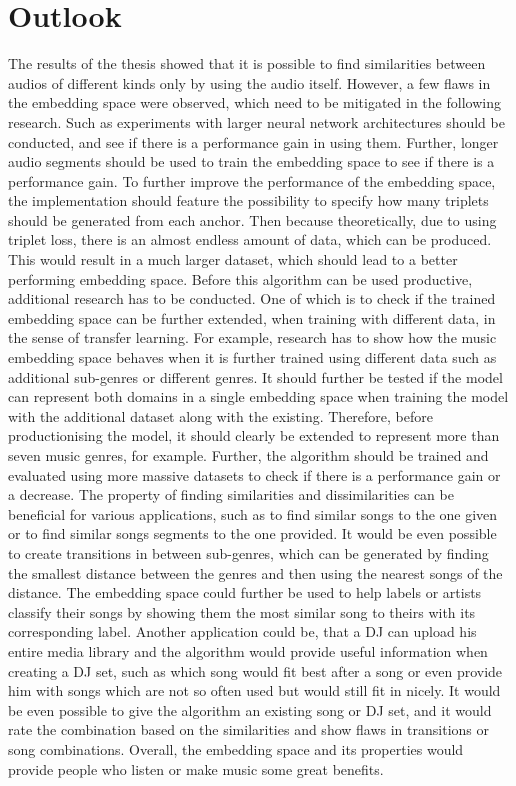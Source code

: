 \section{Outlook}
\label{sec:Outlook}
The results of the thesis showed that it is possible to find similarities between audios of different kinds only by using the audio itself. However, a few flaws in the embedding space were observed, which need to be mitigated in the following research. Such as experiments with larger neural network architectures should be conducted, and see if there is a performance gain in using them. Further, longer audio segments should be used to train the embedding space to see if there is a performance gain. To further improve the performance of the embedding space, the implementation should feature the possibility to specify how many triplets should be generated from each anchor. Then because theoretically, due to using triplet loss, there is an almost endless amount of data, which can be produced. This would result in a much larger dataset, which should lead to a better performing embedding space.
\newline
\newline
Before this algorithm can be used productive, additional research has to be conducted. One of which is to check if the trained embedding space can be further extended, when training with different data, in the sense of transfer learning. For example, research has to show how the music embedding space behaves when it is further trained using different data such as additional sub-genres or different genres. It should further be tested if the model can represent both domains in a single embedding space when training the model with the additional dataset along with the existing. Therefore, before productionising the model, it should clearly be extended to represent more than seven music genres, for example. Further, the algorithm should be trained and evaluated using more massive datasets to check if there is a performance gain or a decrease.
\newline
\newline
The property of finding similarities and dissimilarities can be beneficial for various applications, such as to find similar songs to the one given or to find similar songs segments to the one provided. It would be even possible to create transitions in between sub-genres, which can be generated by finding the smallest distance between the genres and then using the nearest songs of the distance. The embedding space could further be used to help labels or artists classify their songs by showing them the most similar song to theirs with its corresponding label. Another application could be, that a DJ can upload his entire media library and the algorithm would provide useful information when creating a DJ set, such as which song would fit best after a song or even provide him with songs which are not so often used but would still fit in nicely. It would be even possible to give the algorithm an existing song or DJ set, and it would rate the combination based on the similarities and show flaws in transitions or song combinations. Overall, the embedding space and its properties would provide people who listen or make music some great benefits.
